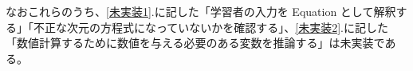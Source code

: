 なおこれらのうち、\ref{未実装1}.に記した「学習者の入力を Equation として解釈する」「不正な次元の方程式になっていないかを確認する」、\ref{未実装2}.に記した「数値計算するために数値を与える必要のある変数を推論する」は未実装である。










